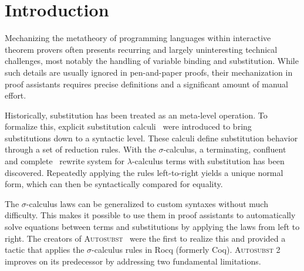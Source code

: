 \documentclass[screen,nonacm]{acmart}
\begin{document}
\maketitle

\section{Introduction}\label{sec:introduction}
Mechanizing the metatheory of programming languages within interactive theorem
provers often presents recurring and largely uninteresting technical
challenges, most notably the handling of variable binding and substitution.
While such details are usually ignored in pen-and-paper proofs, their
mechanization in proof assistants requires precise definitions and a
significant amount of manual effort.

Historically, substitution has been treated as an meta-level operation. To
formalize this, explicit substitution calculi~\cite{10.1145/96709.96712} were
introduced to bring substitutions down to a syntactic level. These calculi
define substitution behavior through a set of reduction rules. With the
$σ$-calculus, a terminating, confluent~\cite{10.1145/226643.226675} and
complete~\cite{10.1145/2676724.2693163} rewrite system for $λ$-calculus terms
with substitution has been discovered. Repeatedly applying the rules
left-to-right yields a unique normal form, which can then be syntactically
compared for equality.

The $σ$-calculus laws can be generalized to custom syntaxes without much
difficulty. This makes it possible to use them in proof assistants to
automatically solve equations between terms and substitutions by applying the
laws from left to right. The creators of
\textsc{Autosubst}~\cite{schafer2015autosubst} were the first to realize this
and provided a tactic that applies the $σ$-calculus rules in Rocq (formerly
Coq). \textsc{Autosubst 2}~\cite{10.1145/3293880.3294101} improves on its
predecessor by addressing two fundamental limitations.
\end{document}
